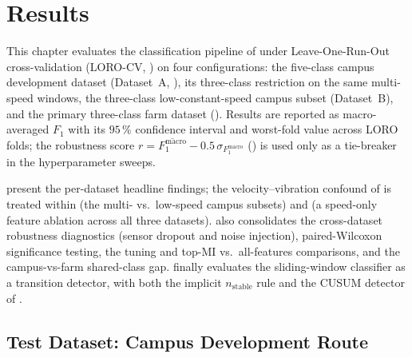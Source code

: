 \chapter{Results}
\label{ch:results}

This chapter evaluates the classification pipeline of  under Leave-One-Run-Out cross-validation (LORO-CV, ) on four configurations: the five-class campus development dataset (Dataset~A, ), its three-class restriction on the same multi-speed windows, the three-class low-constant-speed campus subset (Dataset~B), and the primary three-class farm dataset (). Results are reported as macro-averaged $F_1$ with its $95\,\%$ confidence interval and worst-fold value across LORO folds; the robustness score $r = \overline{F_1^{\mathrm{macro}}} - 0.5\,\sigma_{F_1^{\mathrm{macro}}}$ () is used only as a tie-breaker in the hyperparameter sweeps.

 present the per-dataset headline findings; the velocity--vibration confound of  is treated within  (the multi- vs.\ low-speed campus subsets) and  (a speed-only feature ablation across all three datasets).  also consolidates the cross-dataset robustness diagnostics (sensor dropout and noise injection), paired-Wilcoxon significance testing, the tuning and top-MI vs.\ all-features comparisons, and the campus-vs-farm shared-class gap.  finally evaluates the sliding-window classifier as a transition detector, with both the implicit $n_{\text{stable}}$ rule and the CUSUM detector of .

\section{Test Dataset: Campus Development Route}
\label{sec:res_campus}


